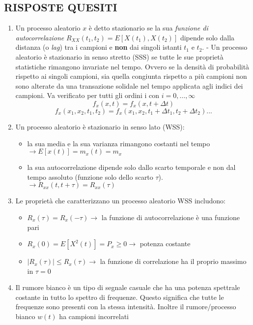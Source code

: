 \documentclass[
]{article}
\begin{document}
\newpage

\subsection{RISPOSTE QUESITI}\label{risposte-quesiti}

\begin{enumerate}
\def\labelenumi{\arabic{enumi}.}
\item
  Un processo aleatorio \(x\) è detto stazionario se la sua
  \emph{funzione di autocorrelazione}
  \(R_{XX}(t_1, t_2) = E[X(t_1), X(t_2)]\) dipende solo dalla distanza
  (o \emph{lag}) tra i campioni e \textbf{non} dai singoli istanti
  \(t_1\) e \(t_2\). - Un processo aleatorio è stazionario in senso
  stretto (SSS) se tutte le sue proprietà statistiche rimangono
  invariate nel tempo. Ovvero se la densità di probabilità rispetto ai
  singoli campioni, sia quella congiunta rispetto a più campioni non
  sono alterate da una transazione solidale nel tempo applicata agli
  indici dei campioni. Va verificato per tutti gli ordini i con
  \(i= 0, \dots, \infty\) \[
  f_x (x, t) = f_x(x, t+ \Delta t)\] \[
  f_x(x_1, x_2, t_1, t_2) = f_x(x_1, x_2, t_1 + \Delta t_1, t_2 + \Delta t_2)...
  \]
\item
  Un processo aleatorio è stazionario in senso lato (WSS):

  \begin{itemize}
  \item
    la sua media e la sua varianza rimangono costanti nel tempo
    \(\to E[x(t)] = m_x(t) = m_x\)\\
  \item
    la sua autocorrelazione dipende solo dallo scarto temporale e non
    dal tempo assoluto (funzione solo dello scarto \(\tau\)).
    \(\to R_{xx}(t, t+\tau) = R_{xx}(\tau)\)
  \end{itemize}
\item
  Le proprietà che caratterizzano un processo aleatorio WSS includono:

  \begin{itemize}
  \item
    \(R_x(\tau) = R_x(-\tau) \to\) la funzione di autocorrelazione è una
    funzione pari
  \item
    \(R_x(0)= E[X^2(t)] = P_x \geq 0 \to\) potenza costante
  \item
    \(|R_x(\tau)| \leq R_x(\tau) \to\) la funzione di correlazione ha il
    proprio massimo in \(\tau = 0\)
  \end{itemize}
\item
  Il rumore bianco è un tipo di segnale casuale che ha una potenza
  spettrale costante in tutto lo spettro di frequenze. Questo significa
  che tutte le frequenze sono presenti con la stessa intensità. Inoltre
  il rumore/processo bianco \(w(t)\) ha campioni incorrelati


\end{enumerate}
\end{document}
